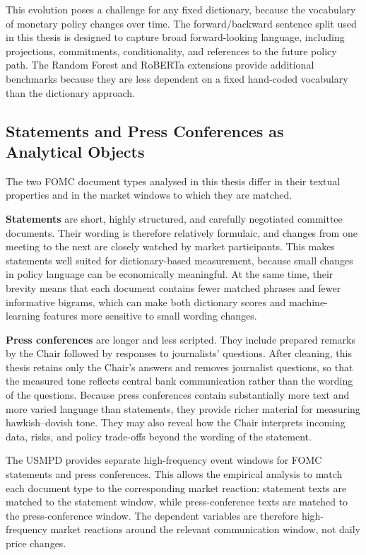 This evolution poses a challenge for any fixed dictionary, because the
vocabulary of monetary policy changes over time. The forward/backward
sentence split used in this thesis is designed to capture broad
forward-looking language, including projections, commitments,
conditionality, and references to the future policy path. The Random
Forest and RoBERTa extensions provide additional benchmarks because they
are less dependent on a fixed hand-coded vocabulary than the dictionary
approach.


\subsection{Statements and Press Conferences as Analytical Objects}
\label{sec:inst_fomc_objects}

The two FOMC document types analysed in this thesis differ in their
textual properties and in the market windows to which they are matched.

\textbf{Statements} are short, highly structured, and carefully
negotiated committee documents. Their wording is therefore relatively
formulaic, and changes from one meeting to the next are closely watched
by market participants. This makes statements well suited for
dictionary-based measurement, because small changes in policy language
can be economically meaningful. At the same time, their brevity means
that each document contains fewer matched phrases and fewer informative
bigrams, which can make both dictionary scores and machine-learning
features more sensitive to small wording changes.

\textbf{Press conferences} are longer and less scripted. They include
prepared remarks by the Chair followed by responses to journalists'
questions. After cleaning, this thesis retains only the Chair's answers
and removes journalist questions, so that the measured tone reflects
central bank communication rather than the wording of the questions.
Because press conferences contain substantially more text and more varied
language than statements, they provide richer material for measuring
hawkish--dovish tone. They may also reveal how the Chair interprets
incoming data, risks, and policy trade-offs beyond the wording of the
statement.

The USMPD provides separate high-frequency event windows for FOMC
statements and press conferences. This allows the empirical analysis to
match each document type to the corresponding market reaction: statement
texts are matched to the statement window, while press-conference texts
are matched to the press-conference window. The dependent variables are
therefore high-frequency market reactions around the relevant
communication window, not daily price changes.


